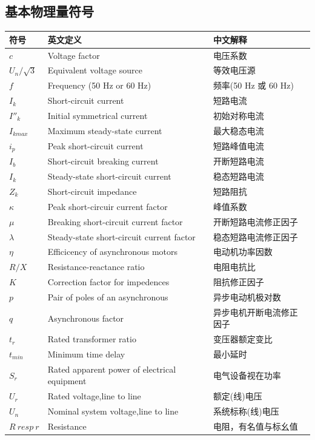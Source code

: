 \documentclass[a4paper,11pt,AutoFakeBold]{ctexart}
\begin{document}
\subsection{基本物理量符号}
\begin{tabular}{lll}
符号 & 英文定义 & 中文解释 \\
\hline
$c$ & Voltage factor & 电压系数 \\
$U_n/\sqrt{3}$ & Equivalent voltage source & 等效电压源 \\
$f$ & Frequency (50 Hz or 60 Hz) & 频率(50 Hz 或 60 Hz) \\
$I_k$ & Short-circuit current & 短路电流 \\
$I''_k$ & Initial symmetrical current & 初始对称电流 \\
$I_{kmax}$ & Maximum steady-state current & 最大稳态电流 \\
$i_p$ & Peak short-circuit current & 短路峰值电流 \\
$I_b$ & Short-circuit breaking current & 开断短路电流 \\
$I_k$ & Steady-state short-circuit current & 稳态短路电流 \\
$Z_k$ & Short-circuit impedance & 短路阻抗 \\
$\kappa$ & Peak short-circuir current factor & 峰值系数 \\
$\mu$ & Breaking short-circuit current factor & 开断短路电流修正因子 \\
$\lambda$ & Steady-state short-circuit current factor & 稳态短路电流修正因子 \\
$\eta$ & Efficicency of asynchronous motors & 电动机功率因数 \\
$R/X$ & Resistance-reactance ratio & 电阻电抗比 \\
$K$ & Correction factor for impedences & 阻抗修正因子 \\
$p$ & Pair of poles of an asynchronous & 异步电动机极对数 \\
$q$ & Asynchronous factor & 异步电机开断电流修正因子 \\
$t_r$ & Rated transformer ratio & 变压器额定变比 \\
$t_{min}$ & Minimum time delay & 最小延时 \\
$S_r$ & Rated apparent power of electrical equipment & 电气设备视在功率 \\
$U_r$ & Rated voltage,line to line & 额定(线)电压 \\
$U_n$ & Nominal system voltage,line to line & 系统标称(线)电压 \\
$R \ resp \ r$ & Resistance & 电阻，有名值与标幺值 \\

\end{tabular}
\end{document}
